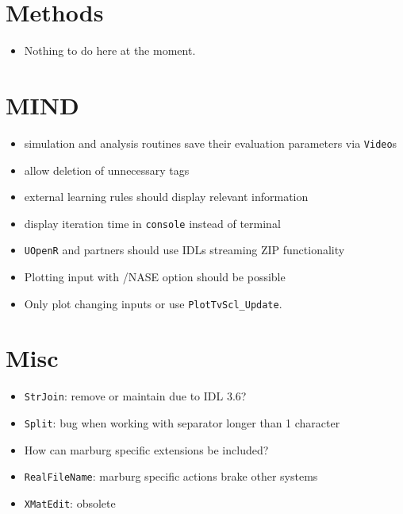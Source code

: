 \documentclass[12pt]{article}
\begin{document}
\section{Methods}
\begin{itemize}
\item Nothing to do here at the moment.
\end{itemize}


\section{MIND}
\begin{itemize}
\item simulation and analysis routines save their evaluation parameters via \texttt{Video}s
\item allow deletion of unnecessary tags
\item external learning rules should display relevant information
\item display iteration time in \texttt{console} instead of terminal
\item \texttt{UOpenR} and partners should use IDLs streaming ZIP functionality
\item Plotting input with /NASE option should be possible
\item Only plot changing inputs or use \texttt{PlotTvScl_Update}.
\end{itemize}



\section{Misc}
\begin{itemize}
\item \texttt{StrJoin}: remove or maintain due to IDL 3.6?
\item \texttt{Split}: bug when working with separator longer than 1 character
\item How can marburg specific extensions be included?
\item \texttt{RealFileName}: marburg specific actions brake other systems
\item \texttt{XMatEdit}: obsolete 
\end{itemize}
\end{document}
